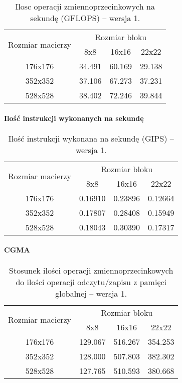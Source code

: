 \begin{table}[H]
\centering
\begin{tabular}{|c|c|c|c|}
\hline
\multirow{2}{*}{Rozmiar macierzy} & \multicolumn{3}{c|}{Rozmiar bloku} \\ \cline{2-4}
& 8x8 & 16x16 & 22x22 \\ \hline
176x176 & 34.491 & 60.169 & 29.138 \\ \hline
352x352 & 37.106 & 67.273 & 37.231 \\ \hline
528x528 & 38.402 & 72.246 & 39.844 \\ \hline
\end{tabular}
\caption{Ilosc operacji zmiennoprzecinkowych na sekundę (GFLOPS) -- wersja 1.}
\end{table}

\paragraph{Ilość instrukcji wykonanych na sekundę}

\begin{table}[H]
\centering
\begin{tabular}{|c|c|c|c|}
\hline
\multirow{2}{*}{Rozmiar macierzy} & \multicolumn{3}{c|}{Rozmiar bloku} \\ \cline{2-4}
& 8x8 & 16x16 & 22x22 \\ \hline
176x176 & 0.16910 & 0.23896 & 0.12664 \\ \hline
352x352 & 0.17807 & 0.28408 & 0.15949 \\ \hline
528x528 & 0.18043 & 0.30390 & 0.17317 \\ \hline
\end{tabular}
\caption{Ilość instrukcji wykonana na sekundę (GIPS) -- wersja 1.}
\end{table}

\paragraph{CGMA}

\begin{table}[H]
\centering
\begin{tabular}{|c|c|c|c|}
\hline
\multirow{2}{*}{Rozmiar macierzy} & \multicolumn{3}{c|}{Rozmiar bloku} \\ \cline{2-4}
& 8x8 & 16x16 & 22x22 \\ \hline
176x176 & 129.067 & 516.267 & 354.253 \\ \hline
352x352 & 128.000 & 507.803 & 382.302 \\ \hline
528x528 & 127.765 & 510.593 & 380.668 \\ \hline
\end{tabular}
\caption{Stosunek ilości operacji zmiennoprzecinkowych do ilości operacji odczytu/zapisu z pamięci globalnej -- wersja 1.}
\end{table}


